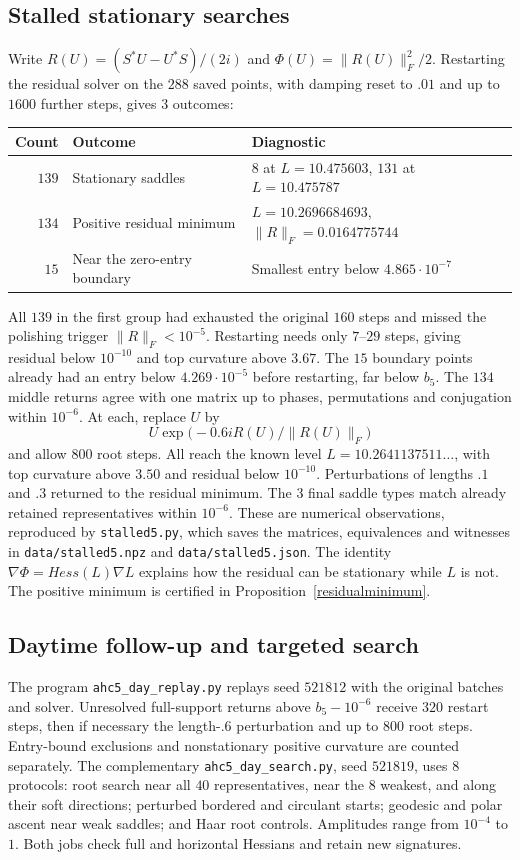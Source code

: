 \documentclass[11pt,a4paper]{article}
\begin{document}
\subsection{Stalled stationary searches}\label{fivestalls}
Write $R(U)=(S^*U-U^*S)/(2i)$ and $\Phi(U)=\|R(U)\|_F^2/2$.
Restarting the residual solver on the $288$ saved points, with damping
reset to $.01$ and up to $1600$ further steps, gives 3 outcomes:
\begin{center}
\begin{tabular}{rll}
\toprule
Count & Outcome & Diagnostic\\
\midrule
$139$ & Stationary saddles & $8$ at $L=10.475603$, $131$ at $L=10.475787$\\
$134$ & Positive residual minimum & $L=10.2696684693$, $\|R\|_F=0.0164775744$\\
$15$ & Near the zero-entry boundary & Smallest entry below $4.865\cdot10^{-7}$\\
\bottomrule
\end{tabular}
\end{center}
All $139$ in the first group had exhausted the original $160$ steps
and missed the polishing trigger $\|R\|_F<10^{-5}$. Restarting needs
only $7$--$29$ steps, giving residual below $10^{-10}$ and top curvature
above $3.67$. The $15$ boundary points already had an entry below
$4.269\cdot10^{-5}$ before restarting, far below $b_5$.
The $134$ middle returns agree with one matrix up to phases,
permutations and conjugation within $10^{-6}$. At each, replace $U$ by
\[
 U\exp\big(-0.6iR(U)/\|R(U)\|_F\big)
\]
and allow $800$ root steps. All reach the known level
$L=10.2641137511\ldots$, with top curvature above $3.50$ and residual
below $10^{-10}$. Perturbations of lengths $.1$ and $.3$ returned to
the residual minimum. The 3 final saddle
types match already retained representatives within $10^{-6}$.
These are numerical observations, reproduced by \texttt{stalled5.py},
which saves the matrices, equivalences and witnesses in
\texttt{data/stalled5.npz} and \texttt{data/stalled5.json}.
The identity $\nabla\Phi=Hess(L)\nabla L$ explains how
the residual can be stationary while $L$ is not. The positive minimum is certified in
Proposition~\ref{residualminimum}.

\subsection{Daytime follow-up and targeted search}\label{fivefollowup}
The program \texttt{ahc5\_day\_replay.py} replays seed $521812$ with
the original batches and solver. Unresolved full-support returns above
$b_5-10^{-6}$ receive $320$ restart steps, then if necessary the
length-$.6$ perturbation and up to $800$ root steps. Entry-bound
exclusions and nonstationary positive curvature are counted separately.
The complementary \texttt{ahc5\_day\_search.py}, seed $521819$, uses
8 protocols: root search near all $40$ representatives, near the
8 weakest, and along their soft directions; perturbed bordered and
circulant starts; geodesic and polar ascent near weak saddles; and
Haar root controls. Amplitudes range from $10^{-4}$ to $1$.
Both jobs check full and horizontal Hessians and retain new signatures.
\end{document}
